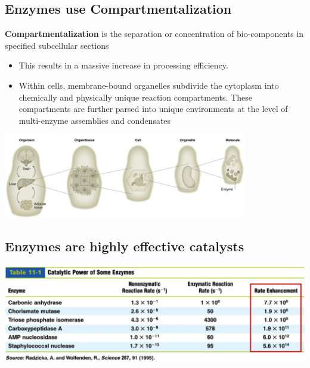 \documentclass[10pt]{article}
\begin{document}
\subsection*{Enzymes use Compartmentalization}
\textbf{Compartmentalization} is the separation or concentration of bio-components in specified subcellular sections
\begin{itemize}
    \item This results in a massive increase in processing efficiency.
    \item Within cells, membrane-bound organelles subdivide the cytoplasm into chemically and physically unique reaction compartments.  These compartments are further parsed into unique environments at the level of multi-enzyme assemblies and condensates
\end{itemize}
\begin{center}
    \includegraphics*[width=0.8\textwidth]{L1_1.png}
\end{center}

\subsection*{Enzymes are highly effective catalysts}
\begin{center}
    \includegraphics*[width=\textwidth]{L1_2.png}
\end{center}
\end{document}
